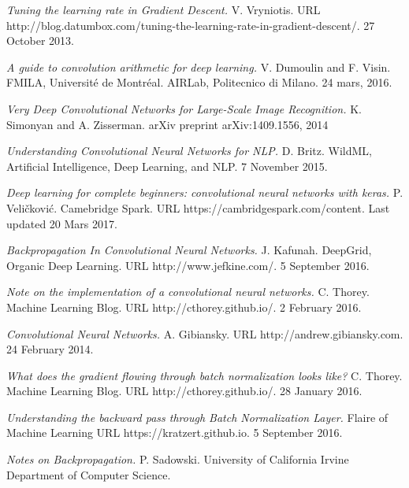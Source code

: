 \documentclass[a4paper, twoside]{article}
\begin{document}
\begin{thebibliography}{99}
	\textit{Tuning the learning rate in Gradient Descent.}
	 V. Vryniotis.
	URL http://blog.datumbox.com/tuning-the-learning-rate-in-gradient-descent/.
	27 October 2013.    
   
	\textit{A guide to convolution arithmetic for deep learning.}
    V. Dumoulin  and F. Visin.
    FMILA, Université de Montréal. AIRLab, Politecnico di Milano.
	24 mars, 2016.
	
	\textit{Very Deep Convolutional Networks for Large-Scale Image Recognition.}
	K. Simonyan and
    A. Zisserman.
    arXiv preprint arXiv:1409.1556, 2014
    
    



	
	\textit{Understanding Convolutional Neural Networks for NLP.}
	D. Britz.
	WildML, Artificial Intelligence, Deep Learning, and NLP.
	7 November 2015.
	
	
	
	\textit{Deep learning for complete beginners: convolutional neural networks with keras.}
	P. Veličković.
	Camebridge Spark. 
	URL https://cambridgespark.com/content.
	Last updated 20 Mars 2017.
	
	    
	\textit{Backpropagation In Convolutional Neural Networks.}
	J. Kafunah.
    DeepGrid, Organic Deep Learning. 
    URL http://www.jefkine.com/.
	5 September 2016.
	
	
	\textit{Note on the implementation of a convolutional neural networks.}
	C. Thorey.
    Machine Learning Blog. 
    URL http://cthorey.github.io/.
	2 February 2016.
	
	
	
	\textit{Convolutional Neural Networks.}
	A. Gibiansky.
    URL http://andrew.gibiansky.com.
	24 February 2014.
	
	
	

	
	\textit{What does the gradient flowing through batch normalization looks like?}
	C. Thorey.
    Machine Learning Blog. 
    URL http://cthorey.github.io/.
	28 January 2016.
	
	

	
	\textit{Understanding the backward pass through Batch Normalization Layer.}
	Flaire of Machine Learning
    URL https://kratzert.github.io.
	5 September 2016.

	\textit{Notes on Backpropagation.}
    P. Sadowski.
    University of California Irvine	Department of Computer Science.
    



\end{thebibliography}
\end{document}
